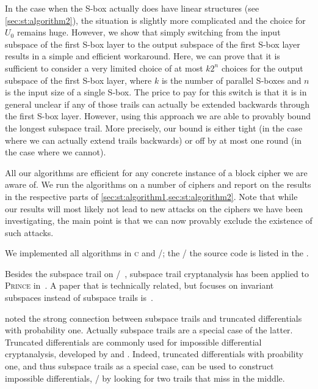 In the case when the S-box actually does have linear structures (see \cref{sec:st:algorithm2}), the situation is slightly more complicated and the choice for $U_0$ remains huge.
However, we show that simply switching from the input subspace of the first S-box layer to the output subspace of the first S-box layer results in a simple and efficient workaround.
Here, we can prove that it is sufficient to consider a very limited choice of at most $k2^n$ choices for the output subspace of the first S-box layer, where $k$ is the number of parallel S-boxes and $n$ is the input size of a single S-box.
The price to pay for this switch is that it is in general unclear if any of those trails can actually be extended backwards through the first S-box layer.
However, using this approach we are able to provably bound the longest subspace trail.
More precisely, our bound is either tight (in the case where we can actually extend trails backwards) or off by at most one round (in the case where we cannot).

All our algorithms are efficient for any concrete instance of a block cipher we are aware of.
We run the algorithms on a number of ciphers and report on the results in the respective parts of \cref{sec:st:algorithm1,sec:st:algorithm2}.
Note that while our results will most likely not lead to new attacks on the ciphers we have been investigating, the main point is that we can now provably exclude the existence of such attacks.

We implemented all algorithms in \textsc{c} and \sage/; the \sage/ the source code is listed in the
\cite[Appendix~A]{ToSC:LeaTezWie18}%
.

Besides the subspace trail on \AES/~\cite{EC:GraRecRon17}, subspace trail cryptanalysis has been applied to \textsc{Prince} in~\cite{INDOCRYPT:GraRec16}.
A paper that is technically related, but focuses on invariant subspaces instead of subspace trails is~\cite{EPRINT:LiuRij17}.

\textcite{ToSC:GraRecRon16} noted the strong connection between subspace trails and truncated differentials with probability one.
Actually subspace trails are a special case of the latter.
Truncated differentials are commonly used for impossible differential cryptanalysis, developed by \textcite{AES:deal} and \textcite{EC:BihBirSha99,FSE:BihBirSha99}.
Indeed, truncated differentials with proability one, and thus subspace trails as a special case, can be used to construct impossible differentials, \eg/ by looking for two trails that miss in the middle.


